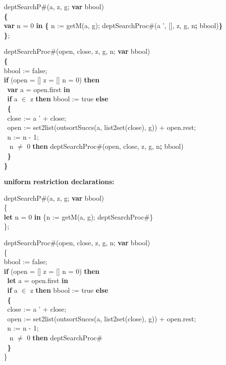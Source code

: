 {\parindent1cm 
deptSearchP\#(a, z, g; {\bf var} bbool) \\
{\bf \{}\\
{\bf var} n = 0 {\bf in} {\bf \{} n := getM(a, g); deptSearchProc\#(a ', [], z, g, n{\bf ; }bbool){\bf \}}\\
{\bf \}};

\bigskip

deptSearchProc\#(open, close, z, g, n; {\bf var} bbool) \\
{\bf \{}\\
bbool := false;\\
 {\bf if} \Not (open = [] \Or z = [] \Or n = 0) {\bf then}\\
 \tabif\  {\bf var} a = open.first {\bf in}\\
 \tabif\ {\bf if} a $\in$ z {\bf then} bbool := true {\bf else}\\
 \tabif\  {\bf \{}\\
 \tabif\ \tabbe close := a ' + close;\\
 \tabif\ \tabbe open := set2list(outsortSuccs(a, list2set(close), g)) + open.rest;\\
 \tabif\ \tabbe n := n - 1;\\
 \tabif\  n $\neq$ 0 {\bf then} deptSearchProc\#(open, close, z, g, n{\bf ; }bbool)\\
 \tabif\ {\bf \}}\\
{\bf \}}
}



\bigskip

{\bf uniform restriction declarations:}

deptSearchP\#(a, z, g; {\bf var} bbool) \\
\{\\
{\bf let} n = 0 {\bf in} \{n := getM(a, g); deptSearchProc\#\}\\
\};

\bigskip

deptSearchProc\#(open, close, z, g, n; {\bf var} bbool) \\
\{\\
bbool := false;\\
 {\bf if} \Not (open = [] \Or z = [] \Or n = 0) {\bf then}\\
 \tabif\  {\bf let} a = open.first {\bf in}\\
 \tabif\ {\bf if} a $\in$ z {\bf then} bbool := true {\bf else}\\
 \tabif\  {\bf \{}\\
 \tabif\ \tabbe close := a ' + close;\\
 \tabif\ \tabbe open := set2list(outsortSuccs(a, list2set(close), g)) + open.rest;\\
 \tabif\ \tabbe n := n - 1;\\
 \tabif\  n $\neq$ 0 {\bf then} deptSearchProc\#\\
 \tabif\ {\bf \}}\\
\}

\bigskip



\par\mbox{}\hrulefill\mbox{}\par
